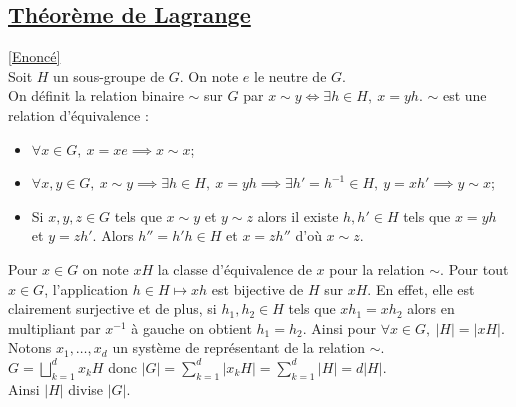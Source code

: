 \documentclass[8pt]{book}
\begin{document}
	\subsection{\underline{Théorème de Lagrange} }
	\label{Théorème de Lagrange corrigé}
	\textcolor{blue}{\hyperref[Théorème de Lagrange]{[Enoncé]}}\\
	Soit $H$ un sous-groupe de $G$. On note $e$ le neutre de $G$.\\
	On définit la relation binaire $\sim$ sur $G$ par $x\sim y\iff \exists h\in H,\ x=yh$. $\sim$ est une relation d'équivalence :\\
	\begin{itemize}
		\item $\forall x\in G,\ x=xe\implies x\sim x$;
		\item $\forall x,y\in G,\ x\sim y\implies \exists h\in H,\ x=yh\implies \exists h'=h^{-1}\in H,\ y=xh'\implies y\sim x$;
		\item Si $x,y,z\in G$ tels que $x\sim y$ et $y\sim z$ alors il existe $h,h'\in H$ tels que $x=yh$ et $y=zh'$. Alors $h''=h'h\in H$ et $x=zh''$ d'où $x\sim z$.
	\end{itemize}
	Pour $x\in G$ on note $xH$ la classe d'équivalence de $x$ pour la relation $\sim$.
	Pour tout $x\in G$, l'application $h\in H\mapsto xh$ est bijective de $H$ sur $xH$. En effet, elle est clairement surjective et de plus, si $h_1,h_2\in H$ tels que $xh_1=xh_2$ alors en multipliant par $x^{-1}$ à gauche on obtient $h_1=h_2$. Ainsi pour $\forall x\in G,\ |H|=|xH|$.\\
	Notons $x_1,\dots,x_d$ un système de représentant de la relation $\sim$.\\
	$G=\displaystyle\bigsqcup\limits_{k=1}^dx_kH$ donc $|G|=\displaystyle\sum\limits_{k=1}^d|x_kH|=\sum\limits_{k=1}^d|H|=d|H|$.\\
	Ainsi $|H|$ divise $|G|$.
	
\end{document}
